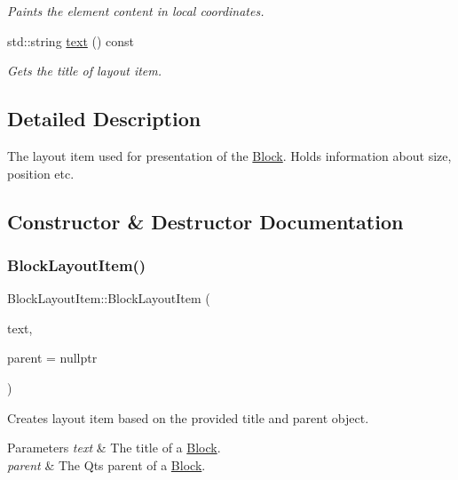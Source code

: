 \begin{DoxyCompactItemize}
\begin{DoxyCompactList}\small\item\em Paints the element content in local coordinates. \end{DoxyCompactList}\item 
std\+::string \mbox{\hyperlink{class_block_layout_item_a374055c252f6532b80b31d065ebf1a11}{text}} () const
\begin{DoxyCompactList}\small\item\em Gets the title of layout item. \end{DoxyCompactList}\end{DoxyCompactItemize}


\subsection{Detailed Description}
The layout item used for presentation of the \mbox{\hyperlink{class_block}{Block}}. Holds information about size, position etc. 



\subsection{Constructor \& Destructor Documentation}
\mbox{\label{class_block_layout_item_ad5ffcaab7d39d6a3c7e29f990acebc21}} 
\subsubsection{\texorpdfstring{BlockLayoutItem()}{BlockLayoutItem()}}
{\footnotesize\ttfamily Block\+Layout\+Item\+::\+Block\+Layout\+Item (\begin{DoxyParamCaption}\item[{const std\+::string \&}]{text,  }\item[{Q\+Graphics\+Item $\ast$}]{parent = {\ttfamily nullptr} }\end{DoxyParamCaption})}



Creates layout item based on the provided title and parent object. 


\begin{DoxyParams}{Parameters}
{\em text} & The title of a \mbox{\hyperlink{class_block}{Block}}. \\
\hline
{\em parent} & The Qt\textquotesingle{}s parent of a \mbox{\hyperlink{class_block}{Block}}. \\
\hline
\end{DoxyParams}
\mbox{\label{class_block_layout_item_aa39e2ec9aa8fd0168bbc5eca07eb5814}} 
